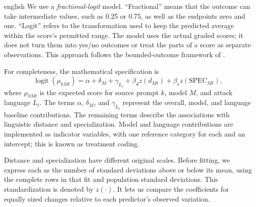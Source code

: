 \begin{otherlanguage*}{english}
We use a \emph{fractional-logit} model. ``Fractional'' means that the outcome can take intermediate values, such as 0.25 or 0.75, as well as the endpoints zero and one. ``Logit'' refers to the transformation used to keep the predicted average within the score's permitted range. The model uses the actual graded scores; it does not turn them into yes/no outcomes or treat the parts of a score as separate observations. This approach follows the bounded-outcome framework of \textcite{papke1993fractional}.


For completeness, the mathematical specification is
\begin{equation}
\operatorname{logit}(\mu_{kMt})=\alpha+\delta_M+\gamma_{L_t}
+\beta_d z(d_{Mt})+\beta_s z(\mathrm{SPEC}_{Mt}),
\label{eq:graded-model}
\end{equation}
where $\mu_{kMt}$ is the expected score for source prompt $k$, model $M$, and attack language $L_t$. The terms $\alpha$, $\delta_M$, and $\gamma_{L_t}$ represent the overall, model, and language baseline contributions. The remaining terms describe the associations with linguistic distance and specialization. Model and language contributions are implemented as indicator variables, with one reference category for each and an intercept; this is known as treatment coding.


Distance and specialization have different original scales. Before fitting, we express each as the number of standard deviations above or below its mean, using the complete rows in that fit and population standard deviations. This standardization is denoted by $z(\cdot)$. It lets us compare the coefficients for equally sized changes relative to each predictor's observed variation.



\end{otherlanguage*}
